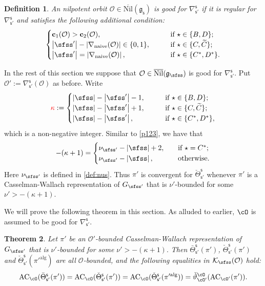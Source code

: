 \documentclass[11pt,a4paper]{amsart}
\def\abs#1{\left|{#1}\right|}
\newcommand{\CK}{{\mathcal {K}}}
\newcommand{\CO}{{\mathcal {O}}}
\newcommand{\g}{\mathfrak g}
\def\DD{\nabla}
\newcommand{\be}{\begin {equation}}
\newcommand{\ee}{\end {equation}}
\numberwithin{equation}{section}
\newtheorem{thm}{Theorem}[section]
\newtheorem{defn}[thm]{Definition}
\theoremstyle{remark}
\def\Nil{\overline{\mathrm{Nil}}}
\def\Thetab{\bar{\Theta}}
\begin{document}
\begin{defn}
An nilpotent orbit $\CO\in \Nil(\g_\mathsf s)$ is good for $\DD_{\mathsf s'}^{\mathsf s}$ if it is regular for $\DD_{\mathsf s'}^{\mathsf s}$ and satisfies the following additional condition:
\[
\begin{cases}
   \mathbf c_1(\CO)>\mathbf c_2(\CO), \qquad  &\textrm{if $\star \in\{B,D\}$}; \\
      \abs{\sfss'}-\abs{\DD_\mathrm{naive}(\CO)}\in\{0,1\},\qquad  &\textrm{if $\star \in\{C, \widetilde C\}$}; \\
\abs{\sfss'}=\abs{\DD_\mathrm{naive}(\CO)}, \qquad &\textrm{if $\star \in \{C^*, D^*\}$}.
  \end{cases}
\]

\end{defn}

In the rest of this section we suppose that $\CO\in \Nil(\g_\sfss)$ is good for $\DD_{\mathsf s'}^{\mathsf s}$. Put $\CO':=\DD_{\mathsf s'}^{\mathsf s}(\CO)$ as before. Write
 \[
  {\color{red}\kappa }:=\begin{cases}
    \abs{\sfss}-\abs{\sfss'}-1, \qquad  &\textrm{if $\star \in\{B,D\}$}; \\
       \abs{\sfss}-\abs{\sfss'}+1, \qquad  &\textrm{if $\star \in\{C, \widetilde C\}$}; \\
 \abs{\sfss}-\abs{\sfss'},\qquad  &\textrm{if $\star \in \{C^*, D^*\}$},
  \end{cases}
\]
which is a non-negative integer.
Similar to \eqref{p123}, we have that
\be\label{p1234}
-(\kappa+1)=
  \begin{cases}
 \nu_{\sfss'}-\abs{\sfss} +2,\quad& \textrm{if $\star =C^*$};\\
  \nu_{\sfss'}-\abs{\sfss},\quad& \textrm{otherwise}.
   \end{cases}
   \ee
Here $\nu_{\sfss'}$ is defined in \eqref{def:nus}. Thus $\pi'$ is convergent for $\check \Theta_{\mathsf s'}^{\mathsf s}$ whenever $\pi'$ is a Casselman-Wallach representation of $G_{\sfss'}$  that is  $\nu'$-bounded for some
$\nu'> -(\kappa +1)$.

We will prove the following theorem in this section.
As alluded to earlier, $\cO$ is assumed to be  good for $\DD_{\mathsf s'}^{\mathsf s}$.

\begin{thm}\label{thm:GDS.AC}
  Let $\pi'$ be an $\CO'$-bounded Casselman-Wallach representation of $G_{\sfss'}$  that is  $\nu'$-bounded for some
$
  \nu'>
 -(\kappa +1).
$
Then $\Thetab_{\mathsf s'}^{\mathsf s}(\pi')$, $\check \Theta_{\mathsf s'}^{\mathsf s}(\pi')$  and $\check \Theta_{\mathsf s'}^{\mathsf s}(\pi'^{\mathrm{alg}})$ are all $\CO$-bounded, and the following equalities in $\CK_\sfss(\CO)$ hold:
    \[
  \mathrm{AC}_{\cO}(\Thetab_{\mathsf s'}^{\mathsf s}(\pi'))=    \mathrm{AC}_{\cO}(\check \Theta_{\mathsf s'}^{\mathsf s}(\pi'))= \mathrm{AC}_{\cO}(\check \Theta_{\mathsf s'}^{\mathsf s}(\pi'^{\mathrm{alg}}))=   \check \vartheta_{\cO'}^\cO(\mathrm{AC}_{\cO'}(\pi')).
  \]
\end{thm}
\end{document}
